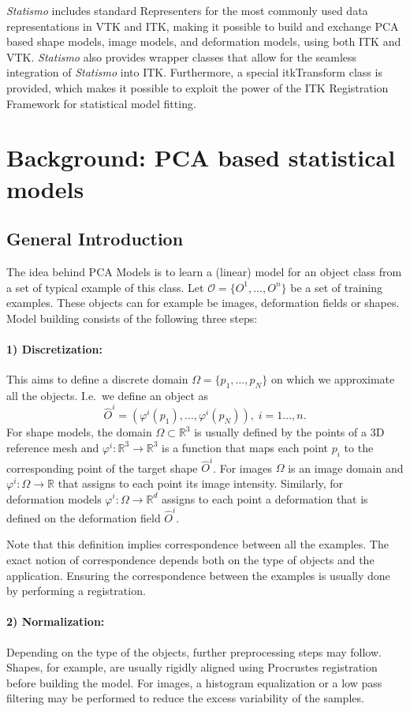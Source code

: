 \documentclass{InsightArticle}
\newcommand{\Statismo}{\emph{Statismo}\xspace}
\def\R{\mathds{R}} %
\begin{document}
\Statismo includes standard Representers for the most commonly used
data representations in VTK and ITK, making it possible to build and
exchange PCA based shape models, image models, and deformation models,
using both ITK and VTK. \Statismo also provides wrapper classes that
allow for the seamless integration of \Statismo into ITK. Furthermore,
a special itkTransform class is provided, which makes it possible 
to exploit the power of the  ITK Registration Framework for
statistical model fitting.


\section{Background: PCA based statistical models}
\subsection{General Introduction}\label{sec:pca-models}
The idea behind PCA Models is to learn a (linear) model for an object class from a set of
typical example of this class. Let $\mathcal{O} = \{O^1, \ldots,
O^n\}$ be a set of training examples. These
objects can for example be images, deformation fields or shapes. Model
building consists of the following three steps:
\paragraph{1) Discretization:} This aims to define a discrete
domain $\Omega = \{p_1, \ldots, p_N\}$ on which we approximate all the objects. I.e.\ we define an object as
\[
\hat{O}^i = (\varphi^i(p_1), \ldots, \varphi^i(p_N)), \; i  = 1 \dots, n. 
\]
For shape models, the domain $\Omega \subset \R^3$ is usually defined
by the points of a 3D reference mesh and $\varphi^i : \R^3 \to \R^3$
is a function that maps each point $p_i$ to the corresponding point of
the target shape $\hat{O}^i$. For images $\Omega$ is an image domain
and $\varphi^i : \Omega \to \R$ that assigns to each point its image
intensity. Similarly, for deformation models $\varphi^i : \Omega \to
\R^d$ assigns to each point a deformation that is defined on the
deformation field $\hat{O}^i$.

Note that this definition implies correspondence between all the examples. The
exact notion of correspondence depends both on the type of objects and the
application. Ensuring the correspondence between the examples is usually done by performing a registration.
\paragraph{2) Normalization:}
Depending on the type of the objects, further preprocessing steps may
follow. Shapes, for example, are usually rigidly aligned using
Procrustes registration before building the model. For images, a
histogram equalization or a low pass filtering may be performed to
reduce the excess variability of the samples.
\end{document}
